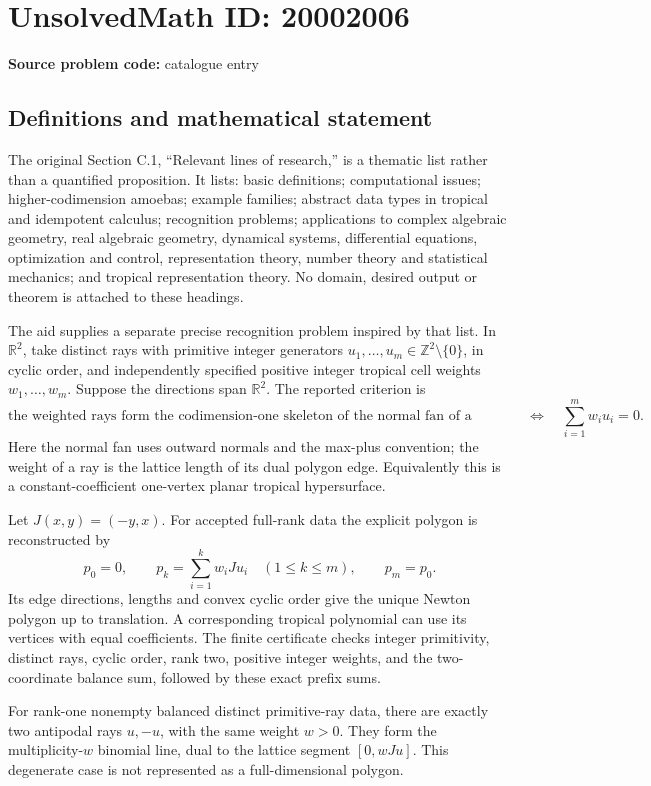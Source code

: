 \documentclass[11pt]{article}
\newcommand{\Z}{\mathbb{Z}}
\newcommand{\R}{\mathbb{R}}
\begin{document}
\section*{UnsolvedMath ID: 20002006}
\textbf{Source problem code:} catalogue entry
\subsection{Definitions and mathematical statement}
The original Section C.1, ``Relevant lines of research,'' is a thematic list rather than a quantified proposition. It lists: basic definitions; computational issues; higher-codimension amoebas; example families; abstract data types in tropical and idempotent calculus; recognition problems; applications to complex algebraic geometry, real algebraic geometry, dynamical systems, differential equations, optimization and control, representation theory, number theory and statistical mechanics; and tropical representation theory. No domain, desired output or theorem is attached to these headings.

The aid supplies a separate precise recognition problem inspired by that list. In \(\R^2\), take distinct rays with primitive integer generators \(u_1,\ldots,u_m\in\Z^2\setminus\{0\}\), in cyclic order, and independently specified positive integer tropical cell weights \(w_1,\ldots,w_m\). Suppose the directions span \(\R^2\). The reported criterion is
\[
 \text{the weighted rays form the codimension-one skeleton of the normal fan
 of a lattice polygon}
 \quad\Longleftrightarrow\quad
 \sum_{i=1}^m w_i u_i=0.
\]
Here the normal fan uses outward normals and the max-plus convention; the weight of a ray is the lattice length of its dual polygon edge. Equivalently this is a constant-coefficient one-vertex planar tropical hypersurface.

Let \(J(x,y)=(-y,x)\). For accepted full-rank data the explicit polygon is reconstructed by
\[
 p_0=0,\qquad p_k=\sum_{i=1}^k w_iJu_i\quad(1\leq k\leq m),
 \qquad p_m=p_0.
\]
Its edge directions, lengths and convex cyclic order give the unique Newton polygon up to translation. A corresponding tropical polynomial can use its vertices with equal coefficients. The finite certificate checks integer primitivity, distinct rays, cyclic order, rank two, positive integer weights, and the two-coordinate balance sum, followed by these exact prefix sums.

For rank-one nonempty balanced distinct primitive-ray data, there are exactly two antipodal rays \(u,-u\), with the same weight \(w>0\). They form the multiplicity-\(w\) binomial line, dual to the lattice segment \([0,wJu]\). This degenerate case is not represented as a full-dimensional polygon.
\end{document}

